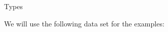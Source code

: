 \begin{frame}[fragile]{Types}

We will use the following data set for the examples:

\begin{Shaded}
\begin{Highlighting}[]
\StringTok{ }\NormalTok{(}\NormalTok{=}\NormalTok{(}\NormalTok{(}\NormalTok{,}\NormalTok{), }\NormalTok{, } \NormalTok{),}
                 \NormalTok{=}\NormalTok{(}\NormalTok{),}
                 \NormalTok{=}\NormalTok{(}\NormalTok{),}
                 \NormalTok{=}\NormalTok{(}\NormalTok{(}\OperatorTok{:}\NormalTok{), }\NormalTok{, } \NormalTok{))}
\end{Highlighting}
\end{Shaded}


\end{frame}

